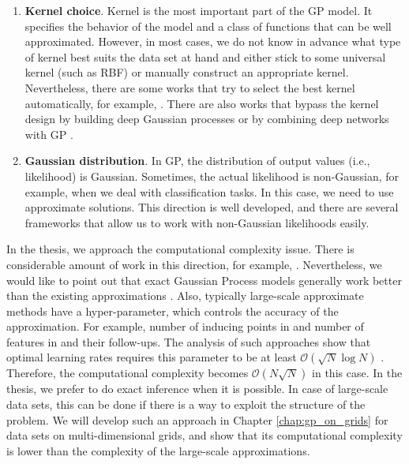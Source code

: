 \begin{enumerate}
    \item \textbf{Kernel choice}. Kernel is the most important part of the GP model.
    It specifies the behavior of the model and a class of functions that can be
    well approximated.
    However, in most cases, we do not know in advance what type of kernel
    best suits the data set at hand and either stick to some universal kernel (such as RBF)
    or manually construct an appropriate kernel.
    Nevertheless, there are some works that try to select the best kernel automatically, for example, \citep{duvenaud2014automatic, abdessalem2017automatic, teng2020scalable}.
    There are also works that bypass the kernel design by building deep Gaussian processes \citep{damianou2013deep} or by
    combining deep networks with GP \citep{wilson2016stochastic}.

    \item \textbf{Gaussian distribution}.
    In GP, the distribution of output values (i.e., likelihood) is Gaussian.
    Sometimes, the actual likelihood is non-Gaussian, for example, when we deal
    with classification tasks.
    In this case, we need to use approximate solutions.
    This direction is well developed, and there are several frameworks
    that allow us to work with non-Gaussian likelihoods \citep{de2017gpflow,gardner2018gpytorch} easily.

\end{enumerate}

In the thesis, we approach the computational complexity issue.
There is considerable amount of work in this direction,
for example, \citep{quinonero2005unifying,rahimi2008random,titsias2009variational,cutajar2017random}.
Nevertheless, we would like to point out that exact Gaussian Process models generally work better than the existing approximations
\citep{cutajar2016preconditioning,wang2019exact}.
Also, typically large-scale approximate methods have a hyper-parameter, which controls
the accuracy of the approximation. For example, number of inducing points in \citep{quinonero2005unifying,titsias2009variational}
and number of features in \citep{rahimi2008random,felix2016orthogonal} and their follow-ups.
The analysis of such approaches show that optimal learning rates requires this parameter to be at least $\mathcal{O}(\sqrt{N} \log N)$
\citep{aless2016generalization,rudi2017falkon}.
Therefore, the computational complexity becomes $\mathcal{O}(N\sqrt{N})$ in this case.
In the thesis, we prefer to do exact inference when it is possible.
In case of large-scale data sets, this can be done if there is a way
to exploit the structure of the problem.
We will develop such an approach in Chapter \ref{chap:gp_on_grids} for data sets on multi-dimensional grids,
and show that its computational complexity is lower than the complexity of the large-scale approximations.



